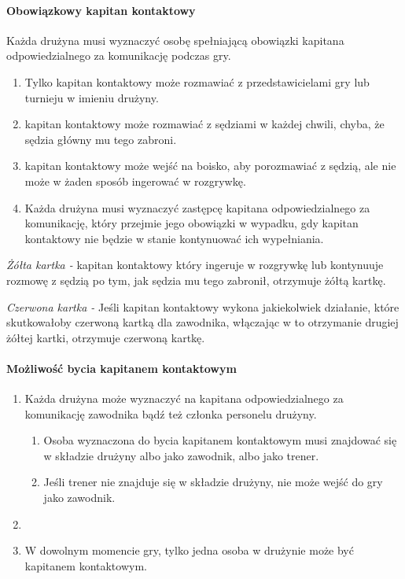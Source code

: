 \documentclass[12pt]{article}
\begin{document}
\paragraph{Obowiązkowy kapitan kontaktowy}
Każda drużyna musi wyznaczyć
osobę spełniającą obowiązki kapitana odpowiedzialnego za komunikację
podczas gry.

\begin{enumerate}
\item Tylko kapitan kontaktowy może rozmawiać z przedstawicielami gry lub
turnieju w imieniu drużyny.

\item kapitan kontaktowy może rozmawiać z sędziami w każdej chwili, chyba,
że sędzia główny mu tego zabroni.

\item kapitan kontaktowy może wejść na boisko, aby porozmawiać z sędzią,
ale nie może w żaden sposób ingerować w rozgrywkę.

\item Każda drużyna musi wyznaczyć zastępcę kapitana odpowiedzialnego za
komunikację, który przejmie jego obowiązki w wypadku, gdy kapitan
kontaktowy nie będzie w stanie kontynuować ich wypełniania.
\end{enumerate}

\emph{Żółta kartka -} kapitan kontaktowy który ingeruje w rozgrywkę lub
kontynuuje rozmowę z sędzią po tym, jak sędzia mu tego zabronił,
otrzymuje żółtą kartkę.

\emph{Czerwona kartka -} Jeśli kapitan kontaktowy wykona jakiekolwiek
działanie, które skutkowałoby czerwoną kartką dla zawodnika, włączając w
to otrzymanie drugiej żółtej kartki, otrzymuje czerwoną kartkę.

\paragraph{Możliwość bycia kapitanem kontaktowym}

\begin{enumerate}
\item
    Każda drużyna może wyznaczyć na kapitana odpowiedzialnego za
  komunikację zawodnika bądź też członka personelu drużyny.
  
  \begin{enumerate}
  \item
        Osoba wyznaczona do bycia kapitanem kontaktowym musi znajdować się w
    składzie drużyny albo jako zawodnik, albo jako trener.
      \item
        Jeśli trener nie znajduje się w składzie drużyny, nie może wejść do
    gry jako zawodnik.
      \end{enumerate}
\item
    \item W dowolnym momencie gry, tylko jedna osoba w drużynie może być
  kapitanem kontaktowym.
  \end{enumerate}
\end{document}
